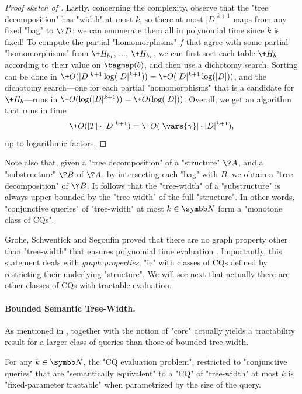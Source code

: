 \begin{proof}[Proof sketch of {}]
	Lastly, concerning the complexity, observe that the "tree decomposition"
	has "width" at most $k$, so there at most
	$|D|^{k+1}$ maps from any fixed "bag" to $\?D$: we can enumerate them all
	in polynomial time since $k$ is fixed! 
	To compute the partial "homomorphisms" $f$ that agree with
	some partial "homomorphisms" from $\+H_{b_1}$, $\dotsc$, $\+H_{b_k}$,
	we can first sort each table $\+H_{b_i}$ according to their value on $\bagmap(b)$,
	and then use a dichotomy search. Sorting can be done
	in $\+O(|D|^{k+1}\log(|D|^{k+1})) = \+O(|D|^{k+1}\log(|D|))$,
	and the dichotomy search---one for each partial "homomorphisms" that is a candidate
	for $\+H_b$---runs in $\+O(\log(|D|^{k+1})) = \+O(\log(|D|))$.
	Overall, we get an algorithm that runs in time
	\[
		\+O(|T|\cdot |D|^{k+1}) = \+O(|\vars{\gamma}|\cdot |D|^{k+1}),
	\]
	up to logarithmic factors.
\end{proof}

Note also that, given a "tree decomposition" of a "structure" $\?A$,
and a "substructure" $\?B$ of $\?A$, by intersecting each "bag" with $B$,
we obtain a "tree decomposition" of $\?B$. It follows that the "tree-width"
of a "substructure" is always upper bounded by the "tree-width" of the full "structure".
In other words, "conjunctive queries" of "tree-width" at most $k\in\N$
form a "monotone class of CQs".

Grohe, Schwentick and Segoufin proved that there
are no graph property other than "tree-width" that ensures
polynomial time evaluation 
\cite[Corollary~19]{GroheSchwentickSegoufin2001Evaluation}.%
Importantly, this statement deals with \emph{graph properties},
"ie" with classes of CQs defined by restricting their underlying "structure".
We will see next that actually there are other classes of CQs
with tractable evaluation.

\paragraph*{Bounded Semantic Tree-Width.}
As mentioned in , 
together with the notion of "core" actually yields a tractability result
for a larger class of queries than those of bounded tree-width.

\begin{proposition}
	For any $k\in\N$, the "CQ evaluation problem",
	restricted to "conjunctive queries" that are "semantically equivalent" 
	to a "CQ" of "tree-width" at most $k$ is "fixed-parameter tractable"
	when parametrized by the size of the query.
\end{proposition}

